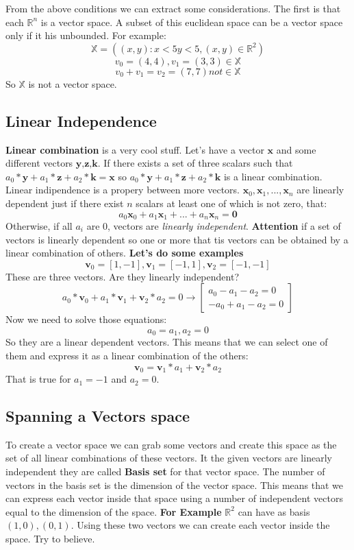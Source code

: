 \documentclass[12pt,a4paper,twoside,openright]{scrbook}
\begin{document}
From the above conditions we can extract some considerations. The first is that each $\mathbb{R}^n$ is a vector space. A subset of this euclidean space can be a vector space only if it his unbounded. For example:
\newline
\[ \mathbb{X} = ( (x,y) : x < 5  y < 5, (x,y) \in \mathbb{R}^2)\] \newline \[
v_0 = (4,4), v_1 = (3,3) \in \mathbb{X}\] \newline \[
v_0 + v_1 = v_2 = (7,7) not \in \mathbb{X}
\]
So $\mathbb{X}$ is not a vector space.

\subsection{Linear Independence}
\textbf{Linear combination} is a very cool stuff. Let's have a vector $\textbf{x}$ and some different vectors $\textbf{y,z,k}$. If there exists a set of three scalars such that $a_0*\textbf{y} + a_1*\textbf{z} + a_2*\textbf{k} = \textbf{x}$ so $a_0*\textbf{y} + a_1*\textbf{z} + a_2*\textbf{k}$ is a linear combination.
Linear indipendence is a propery between more vectors. $\textbf{x}_0, \textbf{x}_1,...,  \textbf{x}_n$ are linearly dependent  just if there exist $n$ scalars at least one of which is not zero, that:
\[a_0\textbf{x}_0 + a_1\textbf{x}_1 +  ... + a_n\textbf{x}_n = \textbf{0} \]
Otherwise, if all $a_i$ are 0, vectors are \textit{linearly independent}.
\textbf{Attention} if a set of vectors is linearly dependent so one or more that tis vectors can be obtained by a linear combination of others.
\newline
\textbf{Let's do some examples}
\[\textbf{v}_0 = [1,-1], \textbf{v}_1=[-1,1] , \textbf{v}_2 = [-1,-1]\]
These are three vectors. Are they linearly independent?
\[a_0*\textbf{v}_0  +  a_1*\textbf{v}_1 + \textbf{v}_2*a_2  = 0 \rightarrow \begin{bmatrix}
 a_0 - a_1 - a_2 = 0 \\ -a_0 + a_1 - a_2 = 0
\end{bmatrix} \]
Now we need to solve those equations:
\[a_0 = a_1, a_2 = 0\]
So they are a linear dependent vectors. This means that we can select one of them and express it as a linear combination of the others:
\[\textbf{v}_0 = \textbf{v}_1*a_1 + \textbf{v}_2*a_2\]
That is true for $a_1 = -1$ and $a_2 = 0$.

\subsection{Spanning a Vectors space}
To create a vector space we can grab some vectors and create this space as the set of all linear combinations of these vectors. It the given vectors are linearly independent they are called \textbf{Basis set} for that vector space. The number of vectors in the basis set is the dimension of the vector space. This means that we can express each vector inside that space using a number of independent vectors equal to the dimension of the space.\newline
\textbf{For Example} $\mathbb{R}^2$ can have as basis $(1,0), (0,1)$. Using these two vectors we can create each vector inside the space. Try to believe.
\end{document}

